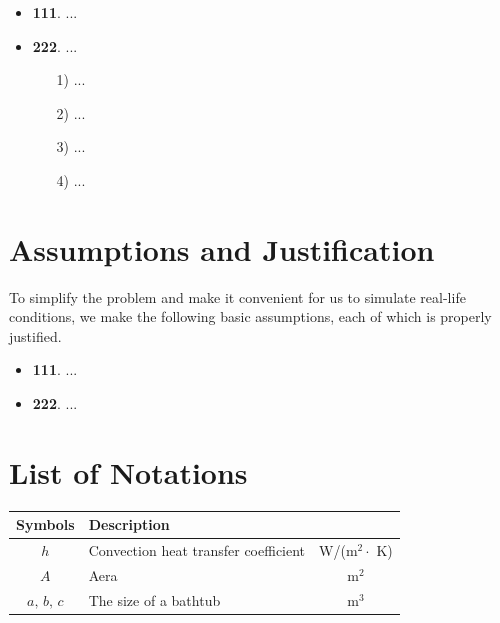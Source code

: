 \documentclass[13pt]{article}
\begin{document}
\begin{itemize}
	\item {\bf 111}. ...
	\item {\bf 222}. ...
	
	\begin{itemize}
		\item[1)] ... 
		\item[2)] ...
		\item[3)] ...
		\item[4)] ...
	\end{itemize}
	
\end{itemize}








\section{Assumptions and Justification}

To simplify the problem and make it convenient for us to simulate real-life 
conditions, we make the following basic assumptions, each of which is properly 
justified.

\begin{itemize}
	\item {\bf 111}. ...
	\item {\bf 222}. ...	
\end{itemize}










\section{List of Notations}
\begin{center}
	\begin{tabular}{clc}
		\toprule
		{\bf Symbols} & {\bf Description} & \quad {\bf Unit} \\
		\midrule 
		$h$ & Convection heat transfer coefficient & \quad W/(m$^2 \cdot$ K) \\[0.2cm]
		$A$ & Aera & \quad m$^2$ \\[0.2cm]
		$a,\,b,\,c$ & The size of a bathtub  & \quad m$^3$ \\
		\bottomrule
	\end{tabular}
\end{center}
\end{document}
